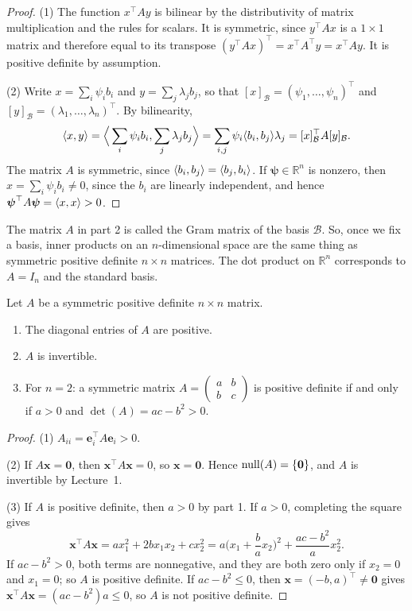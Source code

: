 \begin{proof}
    (1) The function $x^\top A y$ is bilinear by the distributivity of matrix multiplication and the rules for scalars. It is symmetric, since $y^\top A x$ is a $1 \times 1$ matrix and therefore equal to its transpose $(y^\top A x)^\top = x^\top A^\top y = x^\top A y$. It is positive definite by assumption.

    (2) Write $x = \sum_i \psi_i b_i$ and $y = \sum_j \lambda_j b_j$, so that $[x]_{\mathcal{B}} = (\psi_1, \ldots, \psi_n)^\top$ and $[y]_{\mathcal{B}} = (\lambda_1, \ldots, \lambda_n)^\top$. By bilinearity,
    \[\langle x, y \rangle = \Big\langle \sum_i \psi_i b_i, \sum_j \lambda_j b_j \Big\rangle = \sum_{i, j} \psi_i \langle b_i, b_j \rangle \lambda_j = [x]_{\mathcal{B}}^\top A [y]_{\mathcal{B}}.\]
    The matrix $A$ is symmetric, since $\langle b_i, b_j \rangle = \langle b_j, b_i \rangle$. If $\boldsymbol{\psi} \in \mathbb{R}^n$ is nonzero, then $x = \sum_i \psi_i b_i \neq 0$, since the $b_i$ are linearly independent, and hence $\boldsymbol{\psi}^\top A \boldsymbol{\psi} =\langle x, x \rangle > 0$.
\end{proof}

The matrix $A$ in part 2 is called the Gram matrix of the basis $\mathcal{B}$. So, once we fix a basis, inner products on an $n$-dimensional space are the same thing as symmetric positive definite $n \times n$ matrices. The dot product on $\mathbb{R}^n$ corresponds to $A = I_n$ and the standard basis.

\begin{proposition}\label{L2-prop:spd-properties}
    Let $A$ be a symmetric positive definite $n \times n$ matrix.
    \begin{enumerate}
        \item The diagonal entries of $A$ are positive.
        \item $A$ is invertible.
        \item For $n = 2$: a symmetric matrix $A = \begin{pmatrix} a & b \\ b & c \end{pmatrix}$ is positive definite if and only if $a > 0$ and $\det(A) = ac - b^2 > 0$.
    \end{enumerate}
\end{proposition}

\begin{proof}
    (1) $A_{ii} = \mathbf{e}_i^\top A \mathbf{e}_i > 0$.

    (2) If $A\mathbf{x} = \mathbf{0}$, then $\mathbf{x}^\top A \mathbf{x} = 0$, so $\mathbf{x} = \mathbf{0}$. Hence $\operatorname{null}(A) = \{\mathbf{0}\}$, and $A$ is invertible by Lecture~1.

    (3) If $A$ is positive definite, then $a > 0$ by part 1. If $a > 0$, completing the square gives
    \[\mathbf{x}^\top A \mathbf{x} = a x_1^2 + 2b x_1 x_2 + c x_2^2 = a \Big(x_1 + \frac{b}{a} x_2\Big)^2 + \frac{ac - b^2}{a} x_2^2.\]
    If $ac - b^2 > 0$, both terms are nonnegative, and they are both zero only if $x_2 = 0$ and $x_1 = 0$; so $A$ is positive definite. If $ac - b^2 \leq 0$, then $\mathbf{x} = (-b, a)^\top \neq \mathbf{0}$ gives $\mathbf{x}^\top A \mathbf{x} = (ac - b^2) a \leq 0$, so $A$ is not positive definite.
\end{proof}

